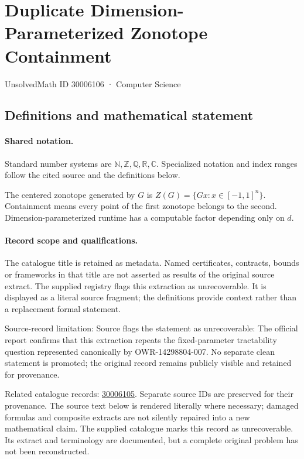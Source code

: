 \documentclass[11pt]{article}
\begin{document}
\setcounter{section}{30006105}
\section{Duplicate Dimension-Parameterized Zonotope Containment}\label{30006106}
{\small\sffamily UnsolvedMath ID 30006106 · Computer Science}
\subsection{Definitions and mathematical statement}

\paragraph{Shared notation.}Standard number systems are $\mathbb N,\mathbb Z,\mathbb Q,\mathbb R,\mathbb C$. Specialized notation and index ranges follow the cited source and the definitions below.


The centered zonotope generated by $G$ is $Z(G)=\{Gx:x\in[-1,1]^n\}$. Containment means every point of the first zonotope belongs to the second. Dimension-parameterized runtime has a computable factor depending only on $d$.
\paragraph{Record scope and qualifications.}
The catalogue title is retained as metadata. Named certificates, contracts, bounds or frameworks in that title are not asserted as results of the original source extract.
The supplied registry flags this extraction as unrecoverable. It is displayed as a literal source fragment; the definitions provide context rather than a replacement formal statement.

Source-record limitation: Source flags the statement as unrecoverable: The official report confirms that this extraction repeats the fixed-parameter tractability question represented canonically by OWR-14298804-007. No separate clean statement is promoted; the original record remains publicly visible and retained for provenance.

Related catalogue records: \href{https://mehmetmars7.github.io/Erdosproblems-llm-hunter/problem.html?type=open_problems&id=30006105}{30006105}. Separate source IDs are preserved for their provenance.
The source text below is rendered literally where necessary; damaged formulas and composite extracts are not silently repaired into a new mathematical claim.
The supplied catalogue marks this record as unrecoverable. Its extract and terminology are documented, but a complete original problem has not been reconstructed.
\end{document}
